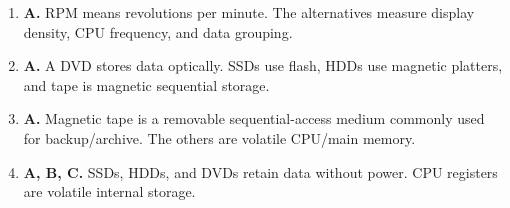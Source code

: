 \begin{enumerate}[label=\textbf{Q\arabic*.}, leftmargin=*]
\item \textbf{A.} RPM means revolutions per minute. The alternatives measure display density, CPU frequency, and data grouping.

\item \textbf{A.} A DVD stores data optically. SSDs use flash, HDDs use magnetic platters, and tape is magnetic sequential storage.

\item \textbf{A.} Magnetic tape is a removable sequential-access medium commonly used for backup/archive. The others are volatile CPU/main memory.

\item \textbf{A, B, C.} SSDs, HDDs, and DVDs retain data without power. CPU registers are volatile internal storage.

\end{enumerate}
